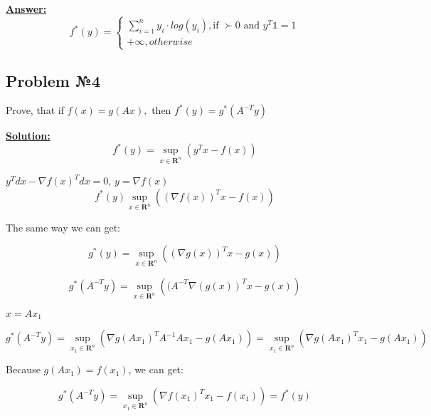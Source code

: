 \underline{\textbf{Answer:}}
\begin{equation*}
f^*(y) = \begin{cases}
    \sum\limits_{i = 1}^n y_i \cdot log(y_i), \text{if } \succ 0 \text{ and } y^T\mathds{1} = 1 \\
    +\infty, otherwise
\end{cases}    
\end{equation*}

\subsection{Problem №4}
Prove, that if $f(x) = g(Ax),$ then $f^*(y) = g^*(A^{-T}y)$

\underline{\textbf{Solution:}}
\begin{equation*}
f^*(y) = \sup_{x \in \mathbf{R}^n}\left(y^Tx - f(x)  \right)
\end{equation*}

$y^Tdx - \nabla f(x)^Tdx = 0$, $y = \nabla f(x)$
\begin{equation*}
    f^*(y) \sup_{x \in \mathbf{R}^n} \left( (\nabla f(x))^Tx - f(x) \right)
\end{equation*}

The same way we can get:

\begin{equation*}
    g^*(y) = \sup_{x \in \mathbf{R}^n} \left( (\nabla g(x))^Tx - g(x) \right)
\end{equation*}

\begin{equation*}
    g^*(A^{-T}y) = \sup_{x \in \mathbf{R}^n} \left( (A^{-T}\nabla(g(x))^Tx - g(x) \right)
\end{equation*}

$x = Ax_1$

\begin{equation*}
    g^*(A^{-T}y) = \sup_{x_1 \in \mathbf{R}^n} \left( \nabla g(Ax_1)^T A^{-1}Ax_1 - g(Ax_1) \right) = \sup_{x_1 \in \mathbf{R}^n} \left( \nabla g(Ax_1)^Tx_1 - g(Ax_1)
    \right)
\end{equation*}

Because $g(Ax_1) = f(x_1)$, we can get:

\begin{equation*}
    g^*(A^{-T}y) = \sup_{x_1 \in \mathbf{R}^n} \left( \nabla f(x_1)^Tx_1 - f(x_1)\right) = f^*(y)
\end{equation*}
    
